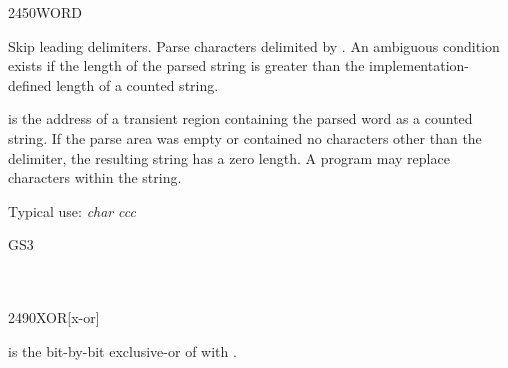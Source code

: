 \begin{worddef}{2450}{WORD}
\item {}

	Skip leading delimiters. Parse characters  delimited
	by .  An ambiguous condition exists if the length of
	the parsed string is greater than the implementation-defined
	length of a counted string.

	 is the address of a transient region containing
	the parsed word as a counted string. If the parse area was
	empty or contained no characters other than the delimiter, the
	resulting string has a zero length.
	A program may replace characters within the string.


	\begin{rationale} %
		Typical use: \emph{char}  \emph{ccc}
	\end{rationale}

	\begin{testing} %
		\ttfamily
		\word{:} GS3     \word{;} \\
		 \\
		 \\
		 \hfill {} 
	\end{testing}
\end{worddef}


\begin{worddef}{2490}{XOR}[x-or]
\item {}

	 is the bit-by-bit exclusive-or of  with
	.

	\begin{testing} %
		 \\
		 \\
		 \\
	\end{testing}
\end{worddef}

